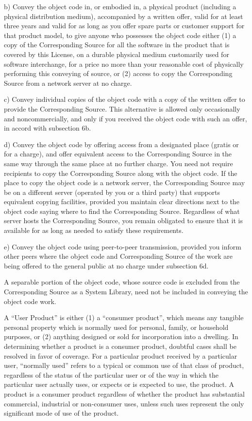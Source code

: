 \documentclass[letterpaper,10pt,english]{sphinxmanual}
\begin{document}
b) Convey the object code in, or embodied in, a physical product
(including a physical distribution medium), accompanied by a
written offer, valid for at least three years and valid for as
long as you offer spare parts or customer support for that product
model, to give anyone who possesses the object code either (1) a
copy of the Corresponding Source for all the software in the
product that is covered by this License, on a durable physical
medium customarily used for software interchange, for a price no
more than your reasonable cost of physically performing this
conveying of source, or (2) access to copy the
Corresponding Source from a network server at no charge.

c) Convey individual copies of the object code with a copy of the
written offer to provide the Corresponding Source.  This
alternative is allowed only occasionally and noncommercially, and
only if you received the object code with such an offer, in accord
with subsection 6b.

d) Convey the object code by offering access from a designated
place (gratis or for a charge), and offer equivalent access to the
Corresponding Source in the same way through the same place at no
further charge.  You need not require recipients to copy the
Corresponding Source along with the object code.  If the place to
copy the object code is a network server, the Corresponding Source
may be on a different server (operated by you or a third party)
that supports equivalent copying facilities, provided you maintain
clear directions next to the object code saying where to find the
Corresponding Source.  Regardless of what server hosts the
Corresponding Source, you remain obligated to ensure that it is
available for as long as needed to satisfy these requirements.

e) Convey the object code using peer-to-peer transmission, provided
you inform other peers where the object code and Corresponding
Source of the work are being offered to the general public at no
charge under subsection 6d.

A separable portion of the object code, whose source code is excluded
from the Corresponding Source as a System Library, need not be
included in conveying the object code work.

A “User Product” is either (1) a “consumer product”, which means any
tangible personal property which is normally used for personal, family,
or household purposes, or (2) anything designed or sold for incorporation
into a dwelling.  In determining whether a product is a consumer product,
doubtful cases shall be resolved in favor of coverage.  For a particular
product received by a particular user, “normally used” refers to a
typical or common use of that class of product, regardless of the status
of the particular user or of the way in which the particular user
actually uses, or expects or is expected to use, the product.  A product
is a consumer product regardless of whether the product has substantial
commercial, industrial or non-consumer uses, unless such uses represent
the only significant mode of use of the product.
\end{document}
